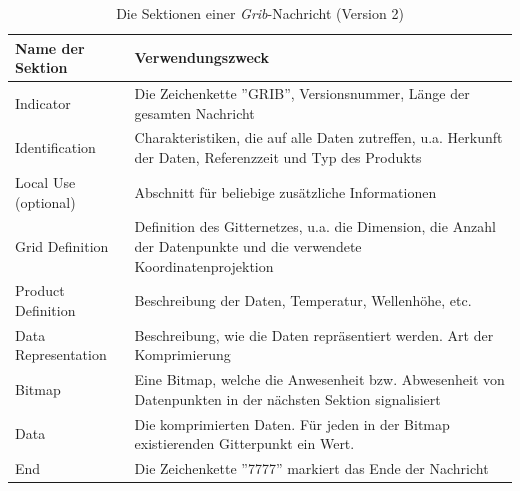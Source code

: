 \begin{table}
  \centering
  {\sf
    \footnotesize
    \begin{longtable}{@{}lp{10cm}@{}}

      \toprule
      \textbf{Name der Sektion} & \textbf{Verwendungszweck} \\

      \midrule

      Indicator & Die Zeichenkette ''GRIB'', Versionsnummer, Länge der gesamten Nachricht \\

      Identification & Charakteristiken, die auf alle Daten zutreffen, u.a. Herkunft der Daten, Referenzzeit und Typ des Produkts \\

      Local Use (optional) & Abschnitt für beliebige zusätzliche Informationen \\

      Grid Definition &  Definition des Gitternetzes, u.a. die Dimension, die Anzahl der Datenpunkte und die verwendete Koordinatenprojektion \\

      Product Definition &  Beschreibung der Daten, Temperatur, Wellenhöhe, etc. \\

      Data Representation &  Beschreibung, wie die Daten repräsentiert werden. Art der Komprimierung \\

      Bitmap & Eine Bitmap, welche die Anwesenheit bzw. Abwesenheit von Datenpunkten in der nächsten Sektion signalisiert \\

      Data &  Die komprimierten Daten. Für jeden in der Bitmap existierenden Gitterpunkt ein Wert. \\

      End & Die Zeichenkette ''7777'' markiert das Ende der Nachricht \\

      \bottomrule

    \end{longtable}
  }

  \caption{Die Sektionen einer \textit{Grib}-Nachricht (Version 2)}
  \label{tab:grib}

\end{table}

